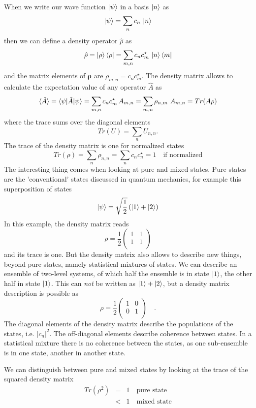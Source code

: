 When we write our wave function $\ket{\psi}$ in  a basis $\ket{n}$ as
\[
 \ket{\psi} = \sum_n c_n \, \ket{n}
\]
then we can define a density operator $\hat{\rho}$ as
\[
\hat{\rho} =  \ket{\rho}\bra{\rho} = \sum_{m,n} c_n c_m^\star \, \ket{n}\bra{m}
\]
and the matrix elements of $\boldsymbol{\rho}$ are $\rho_{m,n} =  c_n c_m^\star$. The density matrix allows to calculate the expectation value of any operator $\hat{A}$ as
\[
 \braket{\hat{A}} =  \braket{\psi | \hat{A} | \psi}  = \sum_{m,n} c_n c_m^\star \, A_{m,n} = \sum_{m,n} \rho_{n,m} \,  \, A_{m,n} = Tr ( A \rho)
\]
where the trace sums over the diagonal elements
\[
 Tr (U ) = \sum_n U_{n,n} .
\]
The trace of the density matrix is one for normalized states 
\[
 Tr (\rho) = \sum_n \rho_{n,n} = \sum_n c_n c_n^\star = 1 \quad \text{if normalized}
\]
The interesting thing comes when looking at pure and mixed states. Pure states are the 'conventional' states discussed in quantum mechanics, for example this superposition of states
\[
\ket{\psi} = \sqrt{\frac{1}{2}} \left( \ket{1} + \ket{2} \right) 
\]
In this example, the density matrix reads
\[
 \rho = \frac{1}{2} \begin{pmatrix}
 1 & 1 \\ 1 & 1 \\
 \end{pmatrix}
\]
and its trace is one. But the density matrix also allows to describe new things, beyond pure states, namely statistical mixtures of states. We can describe an ensemble of two-level systems, of which half the ensemble is in state $\ket{1}$, the other half in state $\ket{1}$. This can \emph{not} be written as 
$\ket{1} + \ket{2} $, but a density matrix description is possible as
\[
 \rho = \frac{1}{2} \begin{pmatrix}
 1 & 0 \\ 0 & 1 \\
 \end{pmatrix} \quad .
\]
The diagonal elements of the density matrix describe the populations of the states, i.e. $|c_n|^2$. The off-diagonal elements describe coherence between states. In a statistical mixture there is no coherence between the states, as one sub-ensemble is in one state, another in another state. 

We can distinguish between pure and mixed states by looking at the trace of the squared density matrix
\begin{eqnarray*}
 Tr (\rho^2) & = & 1 \quad \text{pure state} \\
 				& < & 1 \quad \text{mixed state} \\
\end{eqnarray*}

